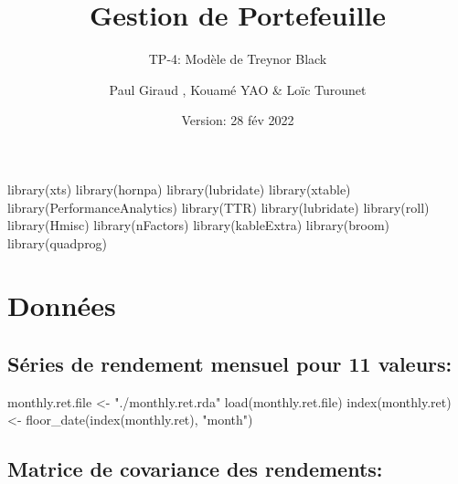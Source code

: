 \documentclass[
]{article}
\title{Gestion de Portefeuille}
\subtitle{TP-4: Modèle de Treynor Black}
\author{Paul Giraud , Kouamé YAO \& Loïc Turounet}
\date{Version: 28 fév 2022}
\newenvironment{Shaded}{\begin{snugshade}}{\end{snugshade}}
\newcommand{\FunctionTok}[1]{\textcolor[rgb]{0.00,0.00,0.00}{#1}}
\newcommand{\NormalTok}[1]{#1}
\newcommand{\OtherTok}[1]{\textcolor[rgb]{0.56,0.35,0.01}{#1}}
\newcommand{\StringTok}[1]{\textcolor[rgb]{0.31,0.60,0.02}{#1}}
\begin{document}
\maketitle

\begin{Shaded}
\begin{Highlighting}[]
\FunctionTok{library}\NormalTok{(xts)}
\FunctionTok{library}\NormalTok{(hornpa)}
\FunctionTok{library}\NormalTok{(lubridate)}
\FunctionTok{library}\NormalTok{(xtable)}
\FunctionTok{library}\NormalTok{(PerformanceAnalytics)}
\FunctionTok{library}\NormalTok{(TTR)}
\FunctionTok{library}\NormalTok{(lubridate)}
\FunctionTok{library}\NormalTok{(roll)}
\FunctionTok{library}\NormalTok{(Hmisc)}
\FunctionTok{library}\NormalTok{(nFactors)}
\FunctionTok{library}\NormalTok{(kableExtra)}
\FunctionTok{library}\NormalTok{(broom)}
\FunctionTok{library}\NormalTok{(quadprog)}
\end{Highlighting}
\end{Shaded}

\hypertarget{donnuxe9es}{%
\section{Données}\label{donnuxe9es}}

\hypertarget{suxe9ries-de-rendement-mensuel-pour-11-valeurs}{%
\subsection{Séries de rendement mensuel pour 11
valeurs:}\label{suxe9ries-de-rendement-mensuel-pour-11-valeurs}}

\begin{Shaded}
\begin{Highlighting}[]
\NormalTok{monthly.ret.file }\OtherTok{\textless{}{-}} \StringTok{"./monthly.ret.rda"}
\FunctionTok{load}\NormalTok{(monthly.ret.file)}
\FunctionTok{index}\NormalTok{(monthly.ret) }\OtherTok{\textless{}{-}} \FunctionTok{floor\_date}\NormalTok{(}\FunctionTok{index}\NormalTok{(monthly.ret), }\StringTok{"month"}\NormalTok{)}
\end{Highlighting}
\end{Shaded}

\hypertarget{matrice-de-covariance-des-rendements}{%
\subsection{Matrice de covariance des
rendements:}\label{matrice-de-covariance-des-rendements}}
\end{document}
